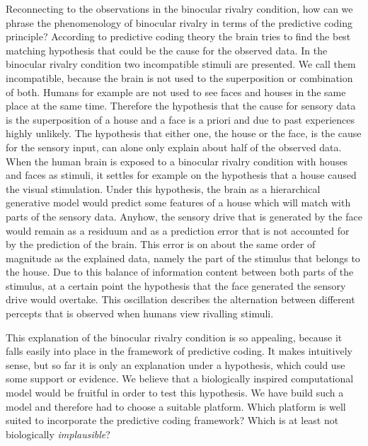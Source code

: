 \documentclass{frontiersSCNS} %
\begin{document}
Reconnecting to the observations in the binocular rivalry condition, how can we phrase the phenomenology of binocular rivalry in terms of the predictive coding principle? According to predictive coding theory the brain tries to find the best matching hypothesis that could be the cause for the observed data. In the binocular rivalry condition two incompatible stimuli are presented. We call them incompatible, because the brain is not used to the superposition or combination of both. Humans for example are not used to see faces and houses in the same place at the same time. Therefore the hypothesis that the cause for sensory data is the superposition of a house and a face is a priori and due to past experiences highly unlikely. The hypothesis that either one, the house or the face, is the cause for the sensory input, can alone only explain about half of the observed data. When the human brain is exposed to a binocular rivalry condition with houses and faces as stimuli, it settles for example on the hypothesis that a house caused the visual stimulation. Under this hypothesis, the brain as a hierarchical generative model would predict some features of a house which will match with parts of the sensory data. Anyhow, the sensory drive that is generated by the face would remain as a residuum and as a prediction error that is not accounted for by the prediction of the brain. This error is on about the same order of magnitude as the explained data, namely the part of the stimulus that belongs to the house. Due to this balance of information content between both parts of the stimulus, at a certain point the hypothesis that the face generated the sensory drive would overtake. This oscillation describes the alternation between different percepts that is observed when humans view rivalling stimuli.

This explanation of the binocular rivalry condition is so appealing, because it falls easily into place in the framework of predictive coding. It makes intuitively sense, but so far it is only an explanation under a hypothesis, which could use some support or evidence. We believe that a biologically inspired computational model would be fruitful in order to test this hypothesis. We have build such a model and therefore had to choose a suitable platform. Which platform is well suited to incorporate the predictive coding framework? Which is at least not biologically \textit{implausible}? 
\end{document}
